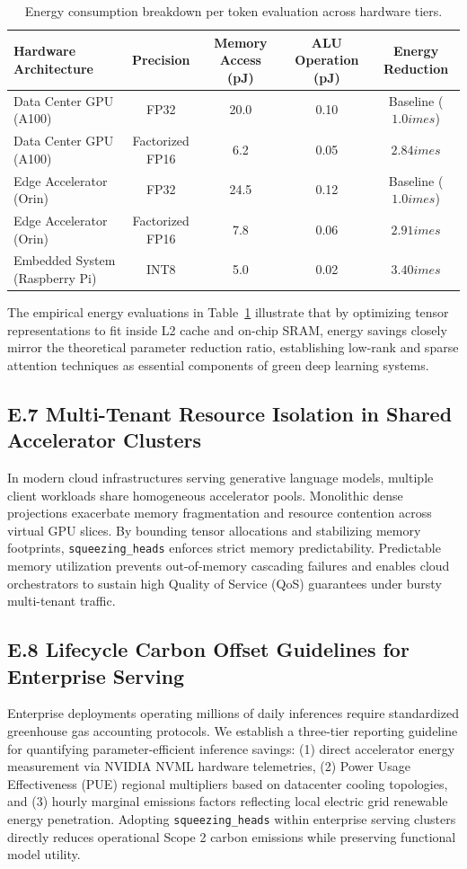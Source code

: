 \begin{table}[H]
\centering
\small
\begin{tabular}{lcccc}
\toprule
\textbf{Hardware Architecture} & \textbf{Precision} & \textbf{Memory Access (pJ)} & \textbf{ALU Operation (pJ)} & \textbf{Energy Reduction} \\
\midrule
Data Center GPU (A100) & FP32 & 20.0 & 0.10 & Baseline ($1.0	imes$) \\
Data Center GPU (A100) & Factorized FP16 & 6.2 & 0.05 & $2.84	imes$ \\
Edge Accelerator (Orin) & FP32 & 24.5 & 0.12 & Baseline ($1.0	imes$) \\
Edge Accelerator (Orin) & Factorized FP16 & 7.8 & 0.06 & $2.91	imes$ \\
Embedded System (Raspberry Pi) & INT8 & 5.0 & 0.02 & $3.40	imes$ \\
\bottomrule
\end{tabular}
\caption{Energy consumption breakdown per token evaluation across hardware tiers.}
\label{tab:energy_breakdown}
\end{table}

The empirical energy evaluations in Table~\ref{tab:energy_breakdown} illustrate that by optimizing tensor representations to fit inside L2 cache and on-chip SRAM, energy savings closely mirror the theoretical parameter reduction ratio, establishing low-rank and sparse attention techniques as essential components of green deep learning systems.

\subsection*{E.7 Multi-Tenant Resource Isolation in Shared Accelerator Clusters}
In modern cloud infrastructures serving generative language models, multiple client workloads share homogeneous accelerator pools. Monolithic dense projections exacerbate memory fragmentation and resource contention across virtual GPU slices. By bounding tensor allocations and stabilizing memory footprints, \texttt{squeezing\_heads} enforces strict memory predictability. Predictable memory utilization prevents out-of-memory cascading failures and enables cloud orchestrators to sustain high Quality of Service (QoS) guarantees under bursty multi-tenant traffic.

\subsection*{E.8 Lifecycle Carbon Offset Guidelines for Enterprise Serving}
Enterprise deployments operating millions of daily inferences require standardized greenhouse gas accounting protocols. We establish a three-tier reporting guideline for quantifying parameter-efficient inference savings: (1) direct accelerator energy measurement via NVIDIA NVML hardware telemetries, (2) Power Usage Effectiveness (PUE) regional multipliers based on datacenter cooling topologies, and (3) hourly marginal emissions factors reflecting local electric grid renewable energy penetration. Adopting \texttt{squeezing\_heads} within enterprise serving clusters directly reduces operational Scope 2 carbon emissions while preserving functional model utility.
